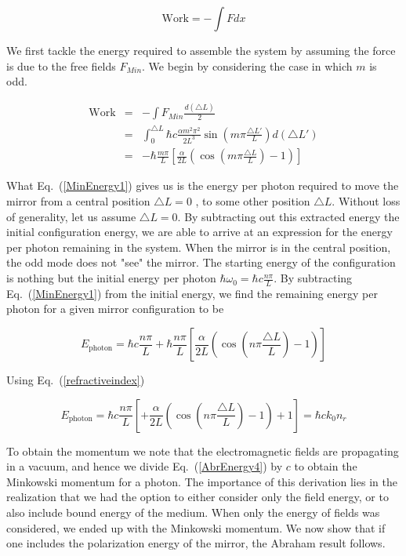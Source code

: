 \documentclass[twocolumn,english,pra,aps,superscriptaddress,floatfix]{revtex4-1}
\begin{document}
\begin{equation}
\mathrm{Work}=-\int Fdx
\label{workenergy1}
\end{equation}


We first tackle the energy required to assemble the system by assuming the force is due to the free fields $F_{Min}$. We begin by considering the case in which $m$ is odd.

\begin{eqnarray}
\mathrm{Work}&=&-\int F_{Min}\frac{d\left(\triangle L\right)}{2} \nonumber \\
&=&\int_{0}^{\triangle L}\hbar c\frac{\alpha m^{2}\pi^{2}}{2L^{3}}\sin(m\pi\frac{\triangle L'}{L})d\left(\triangle L'\right) \nonumber \\
&=&-\hbar\frac{m\pi}{L}\left[\frac{\alpha}{2L}\left(\cos(m\pi\frac{\triangle L}{L})-1\right)\right]
\label{MinEnergy1}
\end{eqnarray}

What Eq.\ (\ref{MinEnergy1}) gives us is the energy per photon required to move the mirror from a central position $\triangle L=0$ , to some other position $\triangle L$.  Without loss of generality, let us assume $\triangle L=0$. By subtracting out this extracted energy the initial configuration energy, we are able to arrive at an expression for the energy per photon remaining in the system.  When the mirror is in the central position, the odd mode does not "see" the mirror. The starting energy of the configuration is nothing but the initial energy per photon $\hbar\omega_{0}=\hbar c\frac{n\pi}{L}$.  By subtracting Eq.\ (\ref{MinEnergy1}) from the initial energy, we find the remaining energy per photon for a given mirror configuration to be


\begin{equation}
E_{\mathrm{photon}}=\hbar c\frac{n\pi}{L}+\hbar\frac{n\pi}{L}\left[\frac{\alpha}{2L}\left(\cos(n\pi\frac{\triangle L}{L})-1\right)\right]
\label{MinEnergy2}
\end{equation}

Using Eq.\ (\ref{refractiveindex})

\begin{equation}
E_{\mathrm{photon}}=\hbar c\frac{n\pi}{L}\left[+\frac{\alpha}{2L}\left(\cos(n\pi\frac{\triangle L}{L})-1\right)+1\right]=\hbar ck_{0}n_{r}
\label{AbrEnergy4}
\end{equation}


To obtain the momentum we note that the electromagnetic fields are propagating in a vacuum, and hence we divide Eq.\ (\ref{AbrEnergy4}) by $c$ to obtain the Minkowski momentum for a photon. The
importance of this derivation lies in the realization that we had the option
to either consider only the field energy, or to also include bound energy of the medium. When only the energy of fields was considered,
we ended up with the Minkowski momentum. We now show that if
one includes the polarization energy of the mirror, the Abraham result follows.
\end{document}
